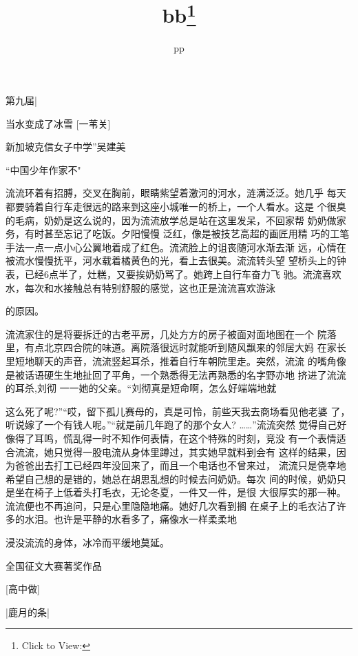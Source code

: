 \documentclass{article}
\title{bb\footnote{Click to View:\url{}}}
\author{pp}
\date{}
\begin{document}

\maketitle


\Large


第九届| 

当水变成了冰雪
[一苇关]

新加坡克信女子中学”吴建美 


“中国少年作家不" 

流流环着有招膊，交叉在胸前，眼睛紫望着激河的河水，涟满泛泛。她几乎
每天都要骑着自行车走很远的路来到这座小城唯一的桥上，一个人看水。这是
个很臭的毛病，奶奶是这么说的，因为流流放学总是站在这里发呆，不回家帮
奶奶做家务，有时甚至忘记了吃饭。夕阳慢慢
\newpage
泛红，像是被技艺高超的画匠用精
巧的工笔手法一点一点小心公翼地着成了红色。流流脸上的诅丧随河水渐去渐
远，心情在被流水慢慢抚平，河水载着橘黄色的光，看上去很美。流流转头望
望桥头上的钟表，已经6点半了，灶糕，又要挨奶奶骂了。她跨上自行车奋力飞
驰。流流喜欢水，每次和水接触总有特别舒服的感觉，这也正是流流喜欢游泳

的原因。 

流流家住的是将要拆迁的古老平房，几处方方的房子被面对面地图在一个
院落里，有点北京四合院的味道。离院落很远时就能听到随风飘来的邻居大妈
在家长里短地聊天的声音，流流竖起耳杀，推着自行车朝院里走。突然，流流
的嘴角像是被话语硬生生地扯回了平角，一个熟悉得无法再熟悉的名字野亦地
挤进了流流的耳杀,刘彻 一一她的父亲。“刘彻真是短命啊，怎么好端端地就
\newpage

这么死了呢?”“哎，留下孤儿赛母的，真是可怜，前些天我去商场看见他老婆
了，听说嫁了一个有钱人呢。”“就是前几年跑了的那个女人? ……”流流突然
觉得自己好像得了耳鸣，慌乱得一时不知作何表情，在这个特殊的时刻，竞没
有一个表情适合流流，她只觉得一股电流从身体里蹲过，其实她早就料到会有
这样的结果，因为爸爸出去打工已经四年没回来了，而且一个电话也不曾来过，
流流只是侥幸地希望自己想的是错的，她总在胡思乱想的时候去问奶奶。每次
间的时候，奶奶只是坐在椅子上低着头打毛衣，无论冬夏，一件又一件，是很
大很厚实的那一种。流流便也不再追问，只是心里隐隐地痛。她好几次看到搁
在桌子上的毛衣沾了许多的水泪。也许是平静的水看多了，痛像水一样柔柔地

浸没流流的身体，冰冷而平缓地莫延。 


\newpage

全国征文大赛著奖作品 


[高中做] 


 

|鹿月的条|
\end{document}
